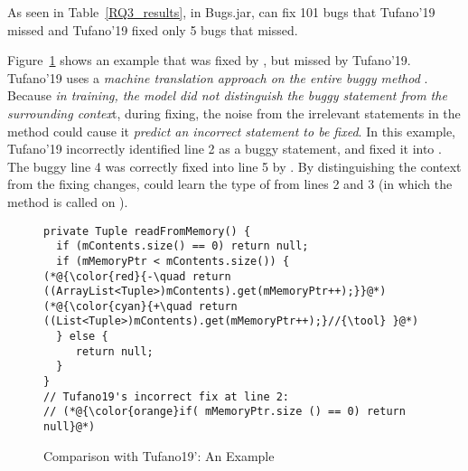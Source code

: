 As seen in Table~\ref{RQ3_results}, in Bugs.jar, {\tool} can fix 101
bugs that Tufano'19 missed and Tufano'19 fixed only 5 bugs
that {\tool} missed.

Figure~\ref{example_tufano19} shows an example that was fixed by
{\tool}, but missed by Tufano'19. Tufano'19 uses a {\em
  machine translation approach on the entire buggy method}
.  Because {\em in training, the model did not
  distinguish the buggy statement from the surrounding contex}t,
during fixing, the noise from the irrelevant statements in the method
could cause it {\em predict an incorrect statement to be fixed}. In
this example, Tufano'19 incorrectly identified line 2 as a buggy
statement, and fixed it into  
\code{()} \code{==}   . The buggy
line 4 was correctly fixed into line 5 by {\tool}. By distinguishing
the context from the fixing changes, {\tool} could learn the type
 of  from lines 2 and 3 (in which the
method  is called on ).


\begin{figure}[t]
	\centering
	\begin{lstlisting}[]
private Tuple readFromMemory() {
  if (mContents.size() == 0) return null;
  if (mMemoryPtr < mContents.size()) {
(*@{\color{red}{-\quad return ((ArrayList<Tuple>)mContents).get(mMemoryPtr++);}}@*)
(*@{\color{cyan}{+\quad return ((List<Tuple>)mContents).get(mMemoryPtr++);}//{\tool} }@*)
  } else {
     return null;
  }
}
// Tufano19's incorrect fix at line 2:
// (*@{\color{orange}if( mMemoryPtr.size () == 0) return null}@*) 
	\end{lstlisting}
        \vspace{-15pt}
	\caption{Comparison with Tufano19': An Example}
	\label{example_tufano19}
\end{figure}

